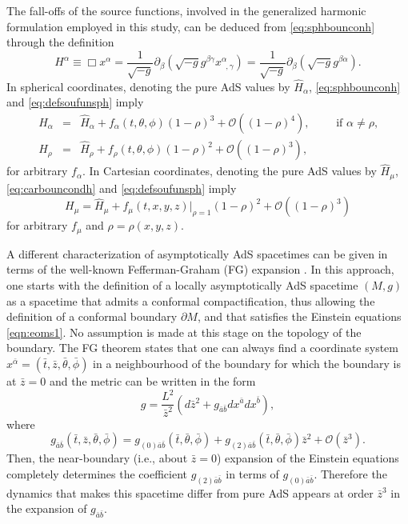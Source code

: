 \documentclass[a4paper,11pt]{article}
\numberwithin{equation}{section}
\begin{document}
The fall-offs of the source functions, involved in the generalized harmonic formulation employed in this study, can be deduced from \eqref{eq:sphbounconh} through the definition 
\begin{equation}\label{eq:defsoufunsph}
H^\alpha \equiv \Box x^\alpha = \frac{1}{\sqrt{-g}}\partial_\beta (\sqrt{-g}g^{\beta\gamma}x^\alpha_{\;\;,\gamma})=\frac{1}{\sqrt{-g}}\partial_\beta (\sqrt{-g}g^{\beta\alpha}).
\end{equation}
In spherical coordinates, denoting the pure AdS values by $\hat{H}_\alpha$, \eqref{eq:sphbounconh} and \eqref{eq:defsoufunsph} imply
\begin{eqnarray}\label{eq:sphbouncondsoufunc}
H_\alpha&=&\hat{H}_\alpha+f_\alpha(t,\theta,\phi)(1-\rho)^3+\mathcal{O}((1-\rho)^4), \qquad \textrm{ if $\alpha\neq\rho$,} \\ \nonumber
H_\rho&=&\hat{H}_\rho+f_\rho(t,\theta,\phi)(1-\rho)^2+\mathcal{O}((1-\rho)^3),
\end{eqnarray}
for arbitrary $f_\alpha$.
In Cartesian coordinates, denoting the pure AdS values by $\hat{H}_\mu$, \eqref{eq:carbouncondh} and \eqref{eq:defsoufunsph} imply
\begin{equation}\label{eq:carbouncondsoufun}
H_\mu=\hat{H}_\mu+f_\mu(t,x,y,z)|_{\rho=1}(1-\rho)^2+\mathcal{O}((1-\rho)^3)
\end{equation}
for arbitrary $f_\mu$ and $\rho=\rho(x,y,z)$.

A different characterization of asymptotically AdS spacetimes can be given in terms of the well-known Fefferman-Graham (FG) expansion \cite{AST_1985__S131__95_0}.
In this approach, one starts with the definition of a locally asymptotically AdS spacetime $(M,g)$ as a spacetime that admits a conformal compactification, thus allowing the definition of a conformal boundary $\partial M$, and that satisfies the Einstein equations \eqref{eqn:eoms1}. No assumption is made at this stage on the topology of the boundary.
The FG theorem states that one can always find a coordinate system $x^{\bar{\alpha}}=(\bar{t},\bar{z},\bar{\theta},\bar{\phi})$ in a neighbourhood of the boundary for which the boundary is at $\bar{z}=0$ and the metric can be written in the form
\begin{equation}
\label{eqn:FGmetric}
g=\frac{L^2}{\bar{z}^2}(d\bar{z}^2+g_{\bar{a}\bar{b}}dx^{\bar{a}}dx^{\bar{b}}),
\end{equation}
where 
\begin{equation}
\label{eqn:FGbdymetric}
g_{\bar{a}\bar{b}}(\bar{t},\bar{z},\bar{\theta},\bar{\phi})=g_{(0)\bar{a}\bar{b}}(\bar{t},\bar{\theta},\bar{\phi})+g_{(2)\bar{a}\bar{b}}(\bar{t},\bar{\theta},\bar{\phi})\bar{z}^2+\mathcal{O}(\bar{z}^3).
\end{equation}
Then, the near-boundary (i.e., about $\bar{z}=0$) expansion of the Einstein equations completely determines the coefficient $g_{(2)\bar{a}\bar{b}}$ in terms of $g_{(0)\bar{a}\bar{b}}$.
Therefore the dynamics that makes this spacetime differ from pure AdS appears at order $\bar{z}^3$ in the expansion of $g_{\bar{a}\bar{b}}$. 
\end{document}
